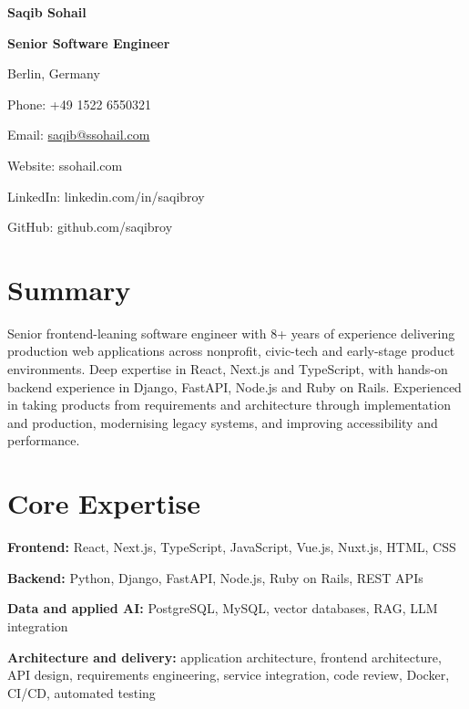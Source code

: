 \documentclass[10pt,a4paper]{article}
\newif\iffrontendcv
\begin{document}
\iffrontendcv
  \hypersetup{pdftitle={Saqib Sohail - Senior Frontend Engineer}}
\else
\fi

{\LARGE\textbf{Saqib Sohail}}\par
\iffrontendcv
  \textbf{Senior Frontend Engineer}\par
\else
  \textbf{Senior Software Engineer}\par
\fi
Berlin, Germany\par
Phone: +49 1522 6550321\par
Email: \href{mailto:saqib@ssohail.com}{saqib@ssohail.com}\par
Website: ssohail.com\par
LinkedIn: linkedin.com/in/saqibroy\par
GitHub: github.com/saqibroy

\section*{Summary}
\iffrontendcv
  Frontend-focused software engineer with 8+ years of experience delivering production web applications across nonprofit, \mbox{civic-tech} and early-stage product environments. Deep expertise in React, Next.js and TypeScript, with additional experience in Vue, Nuxt and backend development using Django, FastAPI, Node.js and Ruby on Rails. Experienced in translating requirements and Figma designs into accessible, responsive interfaces, owning frontend architecture and modernising legacy applications through production.
\else
  Senior frontend-leaning software engineer with 8+ years of experience delivering production web applications across nonprofit, \mbox{civic-tech} and early-stage product environments. Deep expertise in React, Next.js and TypeScript, with hands-on backend experience in Django, FastAPI, Node.js and Ruby on Rails. Experienced in taking products from requirements and architecture through implementation and production, modernising legacy systems, and improving accessibility and performance.
\fi

\section*{Core Expertise}
\textbf{Frontend:} React, Next.js, TypeScript, JavaScript, Vue.js, Nuxt.js, HTML, CSS\par
\iffrontendcv
\textbf{Web quality:} WCAG 2.1, accessibility, responsive design, performance optimisation\par
\else
\textbf{Backend:} Python, Django, FastAPI, Node.js, Ruby on Rails, REST APIs\par
\textbf{Data and applied AI:} PostgreSQL, MySQL, vector databases, RAG, LLM integration\par
\fi
\iffrontendcv
\textbf{Backend:} Python, Django, FastAPI, Node.js, Ruby on Rails, REST APIs\par
\fi
\textbf{Architecture and delivery:} application architecture, frontend architecture, API design, requirements engineering, service integration, code review, Docker, CI/CD, automated testing
\end{document}
